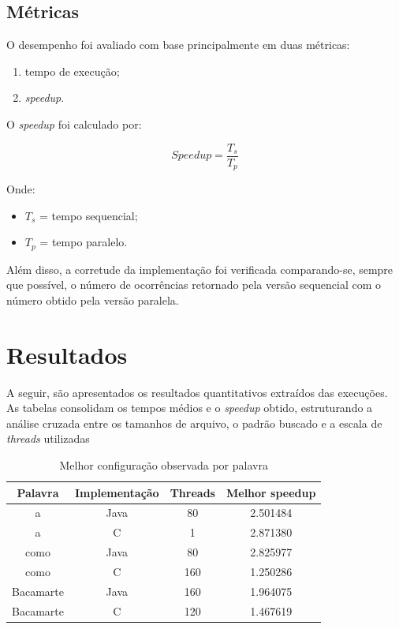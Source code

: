 \documentclass[10pt,twocolumn,a4paper]{article}
\begin{document}
\subsection{Métricas}

O desempenho foi avaliado com base principalmente em duas métricas:

\begin{enumerate}[leftmargin=*]
    \item tempo de execução;
    \item \textit{speedup}.
\end{enumerate}

O \textit{speedup} foi calculado por:

\begin{equation}
Speedup = \frac{T_s}{T_p}
\end{equation}

Onde:
\begin{itemize}[leftmargin=*]
    \item $T_s$ = tempo sequencial;
    \item $T_p$ = tempo paralelo.
\end{itemize}

Além disso, a corretude da implementação foi verificada comparando-se, sempre que possível, o número de ocorrências retornado pela versão sequencial com o número obtido pela versão paralela.

\section{Resultados}
A seguir, são apresentados os resultados quantitativos extraídos das execuções. As tabelas consolidam os tempos médios e o \textit{speedup} obtido, estruturando a análise cruzada entre os tamanhos de arquivo, o padrão buscado e a escala de \textit{threads} utilizadas

\begin{table}[H]
\centering
\caption{Melhor configuração observada por palavra}
\begin{tabular}{cccc}
\toprule
Palavra & Implementação & Threads & Melhor speedup \\
\midrule
a & Java & 80 & 2.501484 \\
a & C & 1 & 2.871380 \\
como & Java & 80 & 2.825977 \\
como & C & 160 & 1.250286 \\
Bacamarte & Java & 160 & 1.964075 \\
Bacamarte & C & 120 & 1.467619 \\
\bottomrule
\end{tabular}
\end{table}
\end{document}
